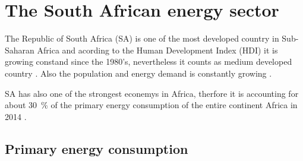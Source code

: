 \chapter{The South African energy sector}
The Republic of South Africa (SA) is one of the most developed country in Sub-Saharan Africa and acording to the Human Development Index (HDI) it is growing constand since the 1980's, nevertheless it counts as medium developed country \cite{UNDP2014}. Also the population and energy demand is constantly growing \cite{TheWorldBank2015,Agency2015}.

SA has also one of the strongest econemys in Africa, therfore it is accounting for about 30~\% of the primary energy consumption of the entire continent Africa in 2014 \cite{BP2015b}. 
\section{Primary energy consumption}
